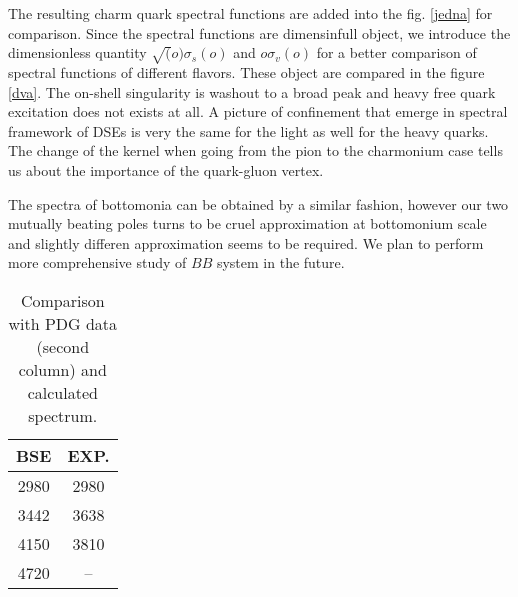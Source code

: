 \documentclass[aps,prd,superscriptaddress,eqsecnum,amsfonts,showpacs,epsfig]{revtex4}
\begin{document}
The resulting charm quark spectral functions are added into the fig. \ref{jedna} for comparison. 
Since the spectral functions are dimensinfull object, we introduce the dimensionless quantity  $\sqrt(o)\sigma_s(o)$ and $o\sigma_v(o)$ for a better comparison of spectral functions of different flavors. These object are compared in the figure \ref{dva}. 
The on-shell singularity is washout to a broad peak  and heavy  free quark  excitation does not exists at all.
A picture of confinement that emerge in spectral framework of DSEs is very the same for the light as well for the heavy quarks.
 The change of the kernel when going from the pion to  the charmonium case  tells us about the importance of the quark-gluon vertex.
   




The spectra of bottomonia can be obtained by a similar fashion, however our two mutually beating poles  turns to be cruel approximation at bottomonium scale and slightly differen approximation seems to be required. We plan to perform  more comprehensive study of $BB$ system in the future.
 

%
\begin{table}[t]
\begin{center}
\small{
\begin{tabular}{|c|c|} \hline \hline 
BSE  & EXP.    \\
\hline \hline
2980 & 2980  \\
\hline
3442   & 3638 \\
\hline
4150 & 3810 \\
\hline
4720 & --   \\
\hline \hline
\end{tabular}}
%
\caption[99]{Comparison with PDG data (second column) and calculated spectrum.
\label{tabbse2}}
\end{center}
\end{table}
\end{document}
